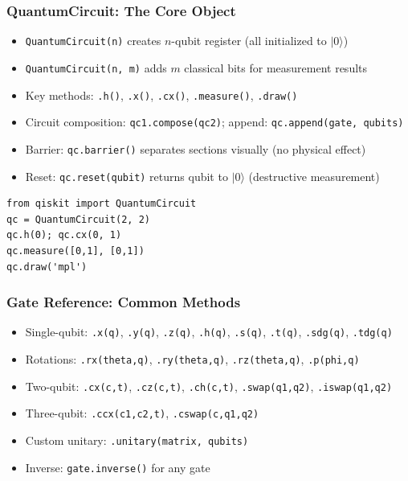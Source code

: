 \begin{frame}[fragile]\frametitle{QuantumCircuit: The Core Object}
\begin{itemize}
\item \texttt{QuantumCircuit(n)} creates $n$-qubit register (all initialized to $|0\rangle$)
\item \texttt{QuantumCircuit(n, m)} adds $m$ classical bits for measurement results
\item Key methods: \texttt{.h()}, \texttt{.x()}, \texttt{.cx()}, \texttt{.measure()}, \texttt{.draw()}
\item Circuit composition: \texttt{qc1.compose(qc2)}; append: \texttt{qc.append(gate, qubits)}
\item Barrier: \texttt{qc.barrier()} separates sections visually (no physical effect)
\item Reset: \texttt{qc.reset(qubit)} returns qubit to $|0\rangle$ (destructive measurement)
\end{itemize}
\begin{verbatim}
from qiskit import QuantumCircuit
qc = QuantumCircuit(2, 2)
qc.h(0); qc.cx(0, 1)
qc.measure([0,1], [0,1])
qc.draw('mpl')
\end{verbatim}
\end{frame}

\begin{frame}[fragile]\frametitle{Gate Reference: Common Methods}
\begin{itemize}
\item Single-qubit: \texttt{.x(q)}, \texttt{.y(q)}, \texttt{.z(q)}, \texttt{.h(q)}, \texttt{.s(q)}, \texttt{.t(q)}, \texttt{.sdg(q)}, \texttt{.tdg(q)}
\item Rotations: \texttt{.rx(theta,q)}, \texttt{.ry(theta,q)}, \texttt{.rz(theta,q)}, \texttt{.p(phi,q)}
\item Two-qubit: \texttt{.cx(c,t)}, \texttt{.cz(c,t)}, \texttt{.ch(c,t)}, \texttt{.swap(q1,q2)}, \texttt{.iswap(q1,q2)}
\item Three-qubit: \texttt{.ccx(c1,c2,t)}, \texttt{.cswap(c,q1,q2)}
\item Custom unitary: \texttt{.unitary(matrix, qubits)}
\item Inverse: \texttt{gate.inverse()} for any gate
\end{itemize}
\end{frame}

